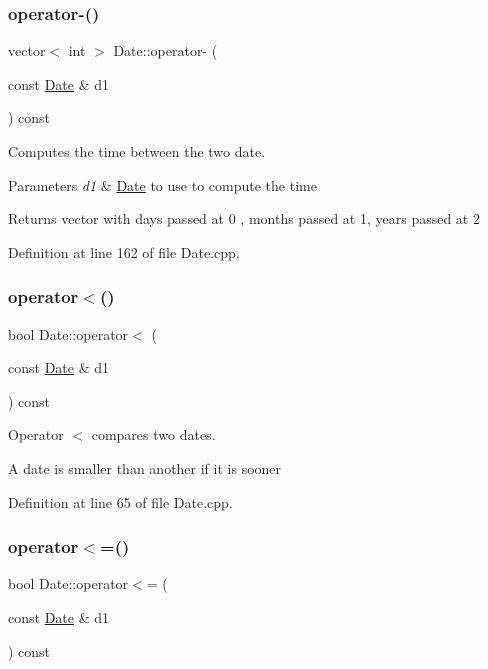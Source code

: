 \subsubsection{\texorpdfstring{operator-\/()}{operator-()}}
{\footnotesize\ttfamily vector$<$ int $>$ Date\+::operator-\/ (\begin{DoxyParamCaption}\item[{const \hyperlink{class_date}{Date} \&}]{d1 }\end{DoxyParamCaption}) const}



Computes the time between the two date. 


\begin{DoxyParams}{Parameters}
{\em d1} & \hyperlink{class_date}{Date} to use to compute the time \\
\hline
\end{DoxyParams}
\begin{DoxyReturn}{Returns}
vector with days passed at 0 , months passed at 1, years passed at 2 
\end{DoxyReturn}


Definition at line 162 of file Date.\+cpp.

\hypertarget{class_date_a352ad2bec798ce5802231d49bf0a16e8}{}\label{class_date_a352ad2bec798ce5802231d49bf0a16e8} 
\subsubsection{\texorpdfstring{operator$<$()}{operator<()}}
{\footnotesize\ttfamily bool Date\+::operator$<$ (\begin{DoxyParamCaption}\item[{const \hyperlink{class_date}{Date} \&}]{d1 }\end{DoxyParamCaption}) const}



Operator $<$ compares two dates. 

A date is smaller than another if it is sooner 

Definition at line 65 of file Date.\+cpp.

\hypertarget{class_date_a50265b854c407eb0f3247b41f5cd1258}{}\label{class_date_a50265b854c407eb0f3247b41f5cd1258} 
\subsubsection{\texorpdfstring{operator$<$=()}{operator<=()}}
{\footnotesize\ttfamily bool Date\+::operator$<$= (\begin{DoxyParamCaption}\item[{const \hyperlink{class_date}{Date} \&}]{d1 }\end{DoxyParamCaption}) const}



